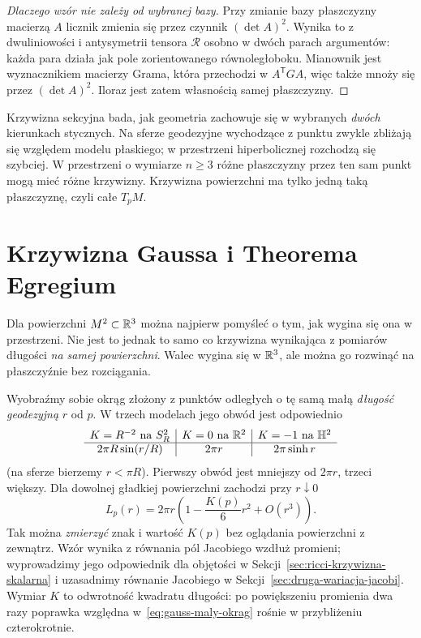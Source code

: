 \begin{proof}[Dlaczego wzór nie zależy od wybranej bazy]
Przy zmianie bazy płaszczyzny macierzą $A$ licznik
zmienia się przez czynnik $(\det A)^2$.
Wynika to z dwuliniowości i antysymetrii tensora
$\mathcal R$ osobno w dwóch parach argumentów:
każda para działa jak pole zorientowanego
równoległoboku. Mianownik jest wyznacznikiem
macierzy Grama, która przechodzi w $A^{\mathsf T}GA$,
więc także mnoży się przez $(\det A)^2$.
Iloraz jest zatem własnością samej płaszczyzny.
\end{proof}

\begin{uwaga}[intuicja]\label{uwaga:intuicja-sekcyjna}
Krzywizna sekcyjna bada, jak geometria zachowuje się
w wybranych \emph{dwóch} kierunkach stycznych. Na
sferze geodezyjne wychodzące z punktu zwykle zbliżają
się względem modelu płaskiego; w przestrzeni
hiperbolicznej rozchodzą się szybciej. W przestrzeni
o wymiarze $n\geq3$ różne płaszczyzny przez ten sam
punkt mogą mieć różne krzywizny. Krzywizna powierzchni
ma tylko jedną taką płaszczyznę, czyli całe $T_pM$.
\end{uwaga}

\section{Krzywizna Gaussa i \texorpdfstring{Theorema Egregium}{Theorema Egregium}}

Dla powierzchni $M^2\subset\mathbb{R}^3$ można najpierw pomyśleć
o tym, jak wygina się ona w przestrzeni. Nie jest to jednak
to samo co krzywizna wynikająca z pomiarów długości
\emph{na samej powierzchni}. Walec wygina się w $\mathbb{R}^3$,
ale można go rozwinąć na płaszczyźnie bez rozciągania.

Wyobraźmy sobie okrąg złożony z punktów odległych
o tę samą małą \emph{długość geodezyjną} $r$ od $p$.
W trzech modelach jego obwód jest odpowiednio
\[
 \begin{array}{c|c|c}
 K=R^{-2}\text{ na }S_R^2 & K=0\text{ na }\mathbb{R}^2
                         & K=-1\text{ na }\mathbb H^2\\ \hline
 2\pi R\sin(r/R) & 2\pi r & 2\pi\sinh r
 \end{array}
\]
(na sferze bierzemy $r<\pi R$). Pierwszy obwód jest
mniejszy od $2\pi r$, trzeci większy. Dla dowolnej
gładkiej powierzchni zachodzi przy $r\downarrow0$
\begin{equation}\label{eq:gauss-maly-okrag}
 L_p(r)=2\pi r\left(1-\frac{K(p)}6r^2+O(r^3)\right).
\end{equation}
Tak można \emph{zmierzyć} znak i wartość $K(p)$ bez
oglądania powierzchni z zewnątrz. Wzór wynika z
równania pól Jacobiego wzdłuż promieni; wyprowadzimy
jego odpowiednik dla objętości w
Sekcji~\ref{sec:ricci-krzywizna-skalarna} i uzasadnimy równanie
Jacobiego w Sekcji~\ref{sec:druga-wariacja-jacobi}.
Wymiar $K$ to odwrotność kwadratu długości: po
powiększeniu promienia dwa razy poprawka względna
w~\eqref{eq:gauss-maly-okrag} rośnie w przybliżeniu
czterokrotnie.

